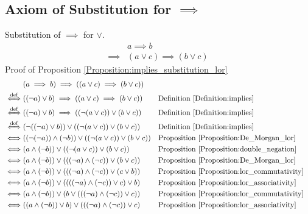 \subsection{Axiom of Substitution for $\implies$}
\begin{prop}
\label{Proposition:implies_substitution_lor}
Substitution of $\implies$ for $\lor$.
\begin{align*}
& a \implies b \\
\implies & (a \lor c) \implies (b \lor c)
\end{align*}
Proof of Proposition \ref{Proposition:implies_substitution_lor}
\begin{align*}
& (a \implies b) \implies ((a \lor c) \implies (b \lor c)) \\
\overset{\operatorname{def}}{\iff} & ((\lnot a) \lor b) \implies ((a \lor c) \implies (b \lor c))
& & \text{Definition \ref{Definition:implies}} \\
\overset{\operatorname{def}}{\iff} & ((\lnot a) \lor b) \implies ((\lnot (a \lor c)) \lor (b \lor c))
& & \text{Definition \ref{Definition:implies}} \\
\overset{\operatorname{def}}{\iff} & (\lnot ((\lnot a) \lor b)) \lor ((\lnot (a \lor c)) \lor (b \lor c))
& & \text{Definition \ref{Definition:implies}} \\
\iff & ((\lnot (\lnot a)) \land (\lnot b)) \lor ((\lnot (a \lor c)) \lor (b \lor c))
& & \text{Proposition \ref{Proposition:De_Morgan_lor}} \\
\iff & (a \land (\lnot b)) \lor ((\lnot (a \lor c)) \lor (b \lor c))
& & \text{Proposition \ref{Proposition:double_negation}} \\
\iff & (a \land (\lnot b)) \lor (((\lnot a) \land (\lnot c)) \lor (b \lor c))
& & \text{Proposition \ref{Proposition:De_Morgan_lor}} \\
\iff & (a \land (\lnot b)) \lor (((\lnot a) \land (\lnot c)) \lor (c \lor b))
& & \text{Proposition \ref{Proposition:lor_commutativity}} \\
\iff & (a \land (\lnot b)) \lor ((((\lnot a) \land (\lnot c)) \lor c) \lor b)
& & \text{Proposition \ref{Proposition:lor_associativity}} \\
\iff & (a \land (\lnot b)) \lor (b \lor (((\lnot a) \land (\lnot c)) \lor c))
& & \text{Proposition \ref{Proposition:lor_commutativity}} \\
\iff & ((a \land (\lnot b)) \lor b) \lor (((\lnot a) \land (\lnot c)) \lor c)
& & \text{Proposition \ref{Proposition:lor_associativity}} \\

\end{align*}
\end{prop}
